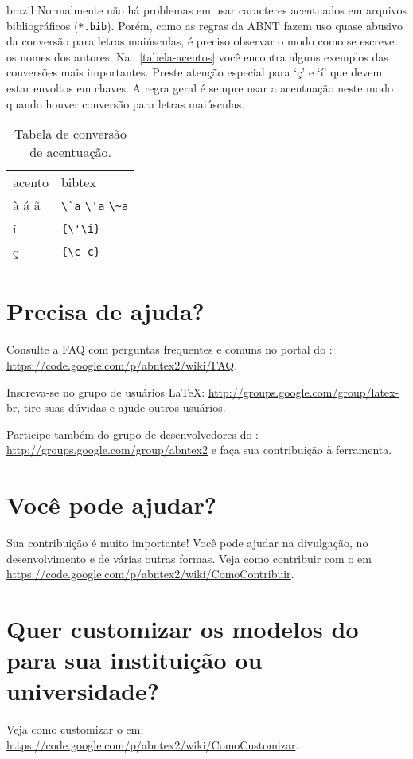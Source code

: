 \begin{otherlanguage*}{brazil}
Normalmente não há problemas em usar caracteres acentuados em arquivos
bibliográficos (\texttt{*.bib}). Porém, como as regras da ABNT fazem uso quase
abusivo da conversão para letras maiúsculas, é preciso observar o modo como se
escreve os nomes dos autores. Na ~\autoref{tabela-acentos} você encontra alguns
exemplos das conversões mais importantes. Preste atenção especial para `ç' e `í'
que devem estar envoltos em chaves. A regra geral é sempre usar a acentuação
neste modo quando houver conversão para letras maiúsculas.

\begin{table}[htbp]
\caption{Tabela de conversão de acentuação.}
\label{tabela-acentos}
\centering
\begin{tabular}{ll}\hline\hline
acento & \textsf{bibtex}\\
à á ã & \verb+\`a+ \verb+\'a+ \verb+\~a+\\
í & \verb+{\'\i}+\\
ç & \verb+{\c c}+\\
\hline\hline
\end{tabular}
\end{table}


\section{Precisa de ajuda?}

Consulte a FAQ com perguntas frequentes e comuns no portal do \abnTeX{}:
\url{https://code.google.com/p/abntex2/wiki/FAQ}.

Inscreva-se no grupo de usuários \LaTeX{}:
\url{http://groups.google.com/group/latex-br}, tire suas dúvidas e ajude
outros usuários.

Participe também do grupo de desenvolvedores do \abnTeX{}:
\url{http://groups.google.com/group/abntex2} e faça sua contribuição à
ferramenta.

\section{Você pode ajudar?}

Sua contribuição é muito importante! Você pode ajudar na divulgação, no
desenvolvimento e de várias outras formas. Veja como contribuir com o \abnTeX{}
em \url{https://code.google.com/p/abntex2/wiki/ComoContribuir}.

%
%
\section{Quer customizar os modelos do \texorpdfstring{\newline}{}\abnTeX{} para sua instituição ou
universidade?}

Veja como customizar o \abnTeX{} em:
\url{https://code.google.com/p/abntex2/wiki/ComoCustomizar}.



\end{otherlanguage*}


